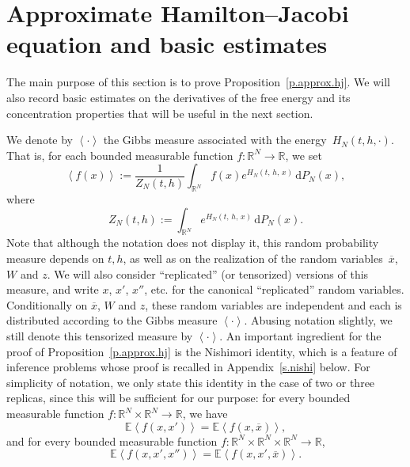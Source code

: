 \documentclass[10pt]{amsart}
\theoremstyle{definition}\newtheorem{defi}[theo]{Definition}\newtheorem{rema}[theo]{Remark}\newtheorem{exam}[theo]{Example}\newtheorem{exem}[theo]{Example}\newtheorem{nota}[theo]{Notation}
\newcommand{\R}{\mathbb{R}}
\newcommand{\E}{\mathbb{E}}
\renewcommand{\d}{\mathrm{d}}
\newcommand{\1}{\mathds{1}}
\newcommand{\la}{\left\langle}
\newcommand{\ra}{\right\rangle}
\renewcommand{\bar}{\overline}
\begin{document}
\section{Approximate Hamilton--Jacobi equation and basic estimates}\label{s.approx.hj}
The main purpose of this section is to prove Proposition~\ref{p.approx.hj}. We will also record basic estimates on the derivatives of the free energy and its concentration properties that will be useful in the next section.



We denote by $\la \cdot \ra$ the Gibbs measure associated with the energy~$H_N(t,{h},\cdot)$. That is, for each bounded measurable function $f : \R^N \to \R$, we set
\begin{equation}\label{e.def.Gibbs}
\la f(x) \ra := \frac{1}{Z_N(t,{h})} \int_{\R^N} f(x) e^{H_N(t,\,{h},\,x)} \, \d P_N(x),
\end{equation}
where
\[
Z_N(t,{h}) := \int_{\R^N} e^{H_N(t,\,{h},\,x)} \, \d P_N(x).
\]
Note that although the notation does not display it, this random probability measure depends on $t, {h}$, as well as on the realization of the random variables~$\bar x$, $W$ and $z$. We will also consider ``replicated'' (or tensorized) versions of this measure, and write $x$, $x'$, $x''$, etc. for the canonical ``replicated'' random variables. Conditionally on $\bar x$, $W$ and $z$, these random variables are independent and each is distributed according to the Gibbs measure $\la \cdot \ra$. Abusing notation slightly, we still denote this tensorized measure by $\la \cdot \ra$. An important ingredient for the proof of Proposition~\ref{p.approx.hj} is the Nishimori identity, which is a feature of inference problems whose proof is recalled in Appendix~\ref{s.nishi} below. For simplicity of notation, we only state this identity in the case of two or three replicas, since this will be sufficient for our purpose: for every bounded measurable function $f: \R^N \times \R^N \to \R$, we have
\begin{equation}\label{e.nishi}
\E \la f(x,x') \ra = \E \la f(x,\bar x) \ra,
\end{equation}
and for every bounded measurable function $f : \R^N \times \R^N \times \R^N \to \R$,
\begin{equation}\label{e.nishi2}
\E \la f(x,x',x'') \ra = \E \la f(x,x',\bar x)\ra.
\end{equation}

\goodbreak
\end{document}
